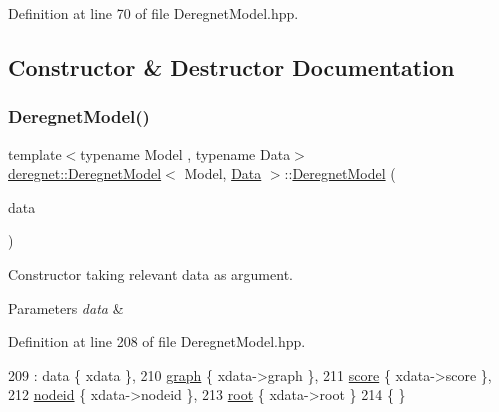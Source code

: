 Definition at line 70 of file Deregnet\+Model.\+hpp.



\subsection{Constructor \& Destructor Documentation}
\mbox{\label{classderegnet_1_1DeregnetModel_a218830114b0bd75965152c5c63a5f4d6}} 
\subsubsection{\texorpdfstring{Deregnet\+Model()}{DeregnetModel()}}
{\footnotesize\ttfamily template$<$typename Model , typename Data$>$ \\
\hyperlink{classderegnet_1_1DeregnetModel}{deregnet\+::\+Deregnet\+Model}$<$ Model, \hyperlink{avgdrgnt_8cpp_a1d1235306db276e9b36acba1db1509e8}{Data} $>$\+::\hyperlink{classderegnet_1_1DeregnetModel}{Deregnet\+Model} (\begin{DoxyParamCaption}\item[{\hyperlink{avgdrgnt_8cpp_a1d1235306db276e9b36acba1db1509e8}{Data} $\ast$}]{data }\end{DoxyParamCaption})}



Constructor taking relevant data as argument. 


\begin{DoxyParams}{Parameters}
{\em data} & \\
\hline
\end{DoxyParams}


Definition at line 208 of file Deregnet\+Model.\+hpp.


\begin{DoxyCode}
209  : data \{ xdata \},
210    \hyperlink{classderegnet_1_1DeregnetModel_a3cd2f54b8e061ef5bed32708d9bc1ef1}{graph} \{ xdata->graph \},
211    \hyperlink{classderegnet_1_1DeregnetModel_a46224b0bda5bab796d3b7cb41c184a4d}{score} \{ xdata->score \},
212    \hyperlink{classderegnet_1_1DeregnetModel_adfebf6f9983c9ccc934469a79381fb78}{nodeid} \{ xdata->nodeid \},
213    \hyperlink{classderegnet_1_1DeregnetModel_a54b20393a0e26d65935d387685d7fe96}{root} \{ xdata->root \}
214 \{ \}
\end{DoxyCode}


